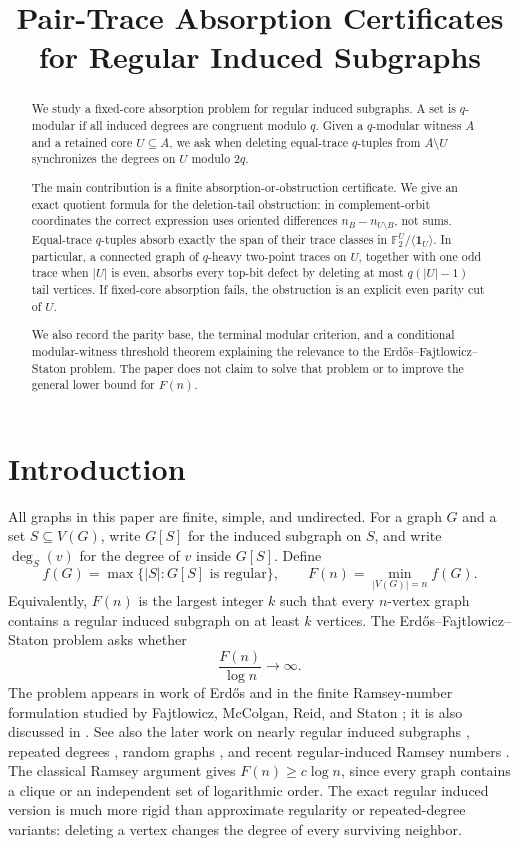 \documentclass[thmsec,dntnbr,nolinenbrs]{dmgt}
\title{Pair-Trace Absorption Certificates for Regular Induced Subgraphs}[Pair-Trace Certificates]
\numberwithin{equation}{section}
\newcommand{\F}{\mathbb{F}}
\newcommand{\one}{\mathbf{1}}
\begin{document}
\begin{abstract}
We study a fixed-core absorption problem for regular induced subgraphs.  A set is \(q\)-modular if all induced degrees are congruent modulo \(q\).  Given a \(q\)-modular witness \(A\) and a retained core \(U\subseteq A\), we ask when deleting equal-trace \(q\)-tuples from \(A\setminus U\) synchronizes the degrees on \(U\) modulo \(2q\).

The main contribution is a finite absorption-or-obstruction certificate.  We give an exact quotient formula for the deletion-tail obstruction: in complement-orbit coordinates the correct expression uses oriented differences \(n_B-n_{U\setminus B}\), not sums.  Equal-trace \(q\)-tuples absorb exactly the span of their trace classes in \(\F_2^U/\langle\one_U\rangle\).  In particular, a connected graph of \(q\)-heavy two-point traces on \(U\), together with one odd trace when \(|U|\) is even, absorbs every top-bit defect by deleting at most \(q(|U|-1)\) tail vertices.  If fixed-core absorption fails, the obstruction is an explicit even parity cut of \(U\).

We also record the parity base, the terminal modular criterion, and a conditional modular-witness threshold theorem explaining the relevance to the Erd\H{o}s--Fajtlowicz--Staton problem.  The paper does not claim to solve that problem or to improve the general lower bound for \(F(n)\).
\end{abstract}

\section{Introduction}

All graphs in this paper are finite, simple, and undirected.  For a graph \(G\) and a set \(S\subseteq V(G)\), write \(G[S]\) for the induced subgraph on \(S\), and write \(\deg_S(v)\) for the degree of \(v\) inside \(G[S]\).  Define
\[
        f(G)=\max\{|S|:G[S]\text{ is regular}\},
        \qquad
        F(n)=\min_{|V(G)|=n} f(G).
\]
Equivalently, \(F(n)\) is the largest integer \(k\) such that every \(n\)-vertex graph contains a regular induced subgraph on at least \(k\) vertices.  The Erd\H{o}s--Fajtlowicz--Staton problem asks whether
\[
        \frac{F(n)}{\log n}\to\infty .
\]
The problem appears in work of Erd\H{o}s and in the finite Ramsey-number formulation studied by Fajtlowicz, McColgan, Reid, and Staton \cite{Erdos1993,FMRS1995}; it is also discussed in \cite{ChungGraham1998}.  See also the later work on nearly regular induced subgraphs \cite{AKS2008}, repeated degrees \cite{CaroYuster2020}, random graphs \cite{KrivelevichSudakovWormald2011}, and recent regular-induced Ramsey numbers \cite{DysonMcKay2026}.  The classical Ramsey argument gives \(F(n)\ge c\log n\), since every graph contains a clique or an independent set of logarithmic order.  The exact regular induced version is much more rigid than approximate regularity or repeated-degree variants: deleting a vertex changes the degree of every surviving neighbor.
\end{document}

